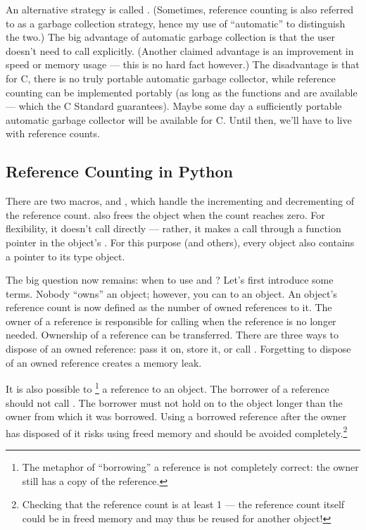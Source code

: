 \documentclass{manual}
\begin{document}
An alternative strategy is called .
(Sometimes, reference counting is also referred to as a garbage
collection strategy, hence my use of ``automatic'' to distinguish the
two.)  The big advantage of automatic garbage collection is that the
user doesn't need to call  explicitly.  (Another claimed
advantage is an improvement in speed or memory usage --- this is no
hard fact however.)  The disadvantage is that for C, there is no
truly portable automatic garbage collector, while reference counting
can be implemented portably (as long as the functions 
and  are available --- which the C Standard guarantees).
Maybe some day a sufficiently portable automatic garbage collector
will be available for C.  Until then, we'll have to live with
reference counts.

\subsection{Reference Counting in Python
            \label{refcountsInPython}}

There are two macros,  and ,
which handle the incrementing and decrementing of the reference count.
 also frees the object when the count reaches zero.
For flexibility, it doesn't call  directly --- rather, it
makes a call through a function pointer in the object's .  For this purpose (and others), every object also contains a
pointer to its type object.

The big question now remains: when to use  and
?  Let's first introduce some terms.  Nobody
``owns'' an object; however, you can  to an
object.  An object's reference count is now defined as the number of
owned references to it.  The owner of a reference is responsible for
calling  when the reference is no longer
needed.  Ownership of a reference can be transferred.  There are three
ways to dispose of an owned reference: pass it on, store it, or call
.  Forgetting to dispose of an owned reference
creates a memory leak.

It is also possible to \footnote{The metaphor of
``borrowing'' a reference is not completely correct: the owner still
has a copy of the reference.} a reference to an object.  The borrower
of a reference should not call .  The borrower must
not hold on to the object longer than the owner from which it was
borrowed.  Using a borrowed reference after the owner has disposed of
it risks using freed memory and should be avoided
completely.\footnote{Checking that the reference count is at least 1
 --- the reference count itself could be in
freed memory and may thus be reused for another object!}
\end{document}
